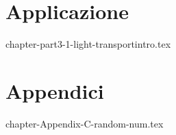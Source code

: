 \documentclass[12pt, openany]{book}
\theoremstyle{theoremdd}
\begin{document}
	\part{Applicazione}
	{chapter-part3-1-light-transportintro.tex}

	\part{Appendici}
	\appendix
	{chapter-Appendix-C-random-num.tex}

	\backmatter
	\printbibliography

	\printglossaries
\end{document}
